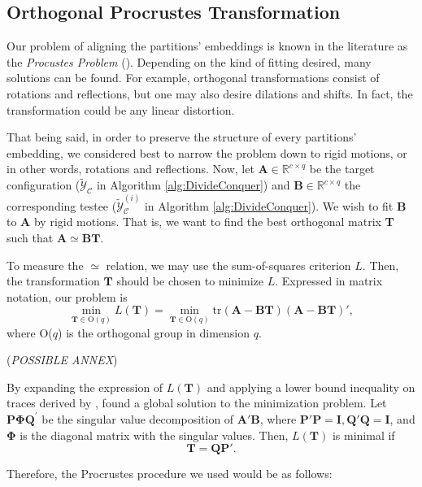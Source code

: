 \subsection{Orthogonal Procrustes Transformation}
\label{sec:Procrustes}

Our problem of aligning the partitions' embeddings is known in the literature as the \textit{Procustes Problem} (\cite{Borg2005}). Depending on the kind of fitting desired, many solutions can be found. For example, orthogonal transformations consist of rotations and reflections, but one may also desire dilations and shifts. In fact, the transformation could be any linear distortion.

That being said, in order to preserve the structure of every partitions' embedding, we considered best to narrow the problem down to rigid motions, or in other words, rotations and reflections. Now, let $\mathbf{A} \in \mathbb{R}^{c \times q}$ be the target configuration ($\tilde{\mathcal{Y}}_{\mathcal{C}}$ in Algorithm \ref{alg:DivideConquer}) and $\mathbf{B} \in \mathbb{R}^{c \times q}$ the corresponding testee ($\tilde{\mathcal{Y}}_{\mathcal{C}}^{(i)}$ in Algorithm \ref{alg:DivideConquer}). We wish to fit \textbf{B} to \textbf{A} by rigid motions. That is, we want to find the best orthogonal matrix \textbf{T} such that $\mathbf{A} \simeq \mathbf{BT}$.

To measure the $\simeq$ relation, we may use the sum-of-squares criterion $L$. Then, the transformation $\mathbf{T}$ should be chosen to minimize $L$. Expressed in matrix notation, our problem is
$$
\min_{\mathbf{T} \in \text{O}(q)} L(\mathbf{T}) = \min_{\mathbf{T} \in \text{O}(q)} \text{tr}(\mathbf{A}-\mathbf{BT})(\mathbf{A}-\mathbf{BT})',
$$
where O($q$) is the orthogonal group in dimension $q$.

(\textit{POSSIBLE ANNEX})

By expanding the expression of $L(\mathbf{T})$ and applying a lower bound inequality on traces derived by \cite{Kristof1970}, \cite{Borg2005} found a global solution to the minimization problem. Let $\mathbf{P} \boldsymbol{\Phi} \mathbf{Q}^{\prime}$ be the singular value decomposition of $\mathbf{A}' \mathbf{B}$, where $\mathbf{P}' \mathbf{P}=\mathbf{I}, \mathbf{Q}' \mathbf{Q}=\mathbf{I}$, and $\boldsymbol{\Phi}$ is the diagonal matrix with the singular values. Then, $L(\mathbf{T})$ is minimal if
$$
\mathbf{T} = \mathbf{QP}'.
$$

Therefore, the Procrustes procedure we used would be as follows:


